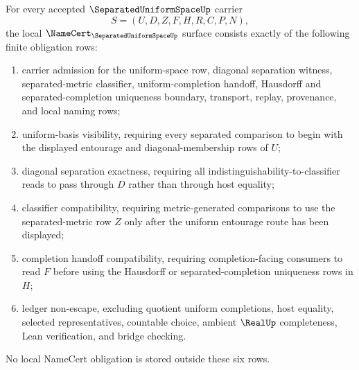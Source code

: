 \begin{theorem}
\label{thm:separated-uniform-space-namecert-obligations}
For every accepted $\SeparatedUniformSpaceUp$ carrier
$$
S=(U,D,Z,F,H,R,C,P,N),
$$
the local $\NameCert_{\SeparatedUniformSpaceUp}$ surface consists exactly of the following finite obligation rows:
\begin{enumerate}
\item carrier admission for the uniform-space row, diagonal separation witness, separated-metric classifier, uniform-completion handoff, Hausdorff and separated-completion uniqueness boundary, transport, replay, provenance, and local naming rows;
\item uniform-basis visibility, requiring every separated comparison to begin with the displayed entourage and diagonal-membership rows of $U$;
\item diagonal separation exactness, requiring all indistinguishability-to-classifier reads to pass through $D$ rather than through host equality;
\item classifier compatibility, requiring metric-generated comparisons to use the separated-metric row $Z$ only after the uniform entourage route has been displayed;
\item completion handoff compatibility, requiring completion-facing consumers to read $F$ before using the Hausdorff or separated-completion uniqueness rows in $H$;
\item ledger non-escape, excluding quotient uniform completions, host equality, selected representatives, countable choice, ambient $\RealUp$ completeness, Lean verification, and bridge checking.
\end{enumerate}
No local NameCert obligation is stored outside these six rows.
\end{theorem}
